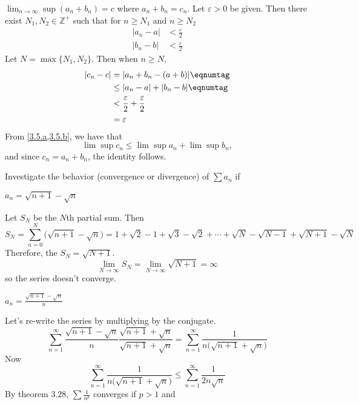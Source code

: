 \begin{exercise}
  \(\lim_{n\to\infty}\sup (a_n + b_n) = c\) where \(a_n + b_n = c_n\).
  Let \(\varepsilon > 0\) be given.
  Then there exist \(N_1,N_2\in\mathbb{Z}^+\) such that for \(n\geq N_1\) and
  \(n\geq N_2\)
  \begin{align*}
    \lvert a_n - a\rvert & < \frac{\varepsilon}{2}\\
    \lvert b_n - b\rvert & < \frac{\varepsilon}{2}
  \end{align*}
  Let \(N = \max\{N_1,N_2\}\).
  Then when \(n\geq N\),
  \begin{align*}
    \lvert c_n - c\rvert & = \lvert a_n + b_n - (a + b)\rvert
                           \eqnumtag\label{3.5.a}\\
                         & \leq \lvert a_n - a\rvert + \lvert b_n - b\rvert
                           \eqnumtag\label{3.5.b}\\
                         & < \frac{\varepsilon}{2} + \frac{\varepsilon}{2}\\
                         & = \varepsilon
  \end{align*}
  From \cref{3.5.a,3.5.b}, we have that
  \[
  \lim\sup c_n\leq\lim\sup a_n + \lim\sup b_n,
  \]
  and since \(c_n = a_n + b_n\), the identity follows.
\item
  Investigate the behavior (convergence or divergence) of \(\sum a_n\) if
  \begin{exercise}[label = (\alph*)]
  \item
    \(a_n = \sqrt{n + 1} - \sqrt{n}\)
    \par\smallskip
    Let \(S_N\) be the \(N\)th partial sum.
    Then
    \[
    S_N = \sum_{n = 0}^N\bigl(\sqrt{n + 1} - \sqrt{n}\bigr) =
    1 + \sqrt{2} - 1 + \sqrt{3} - \sqrt{2} + \cdots + \sqrt{N} - \sqrt{N - 1}
    + \sqrt{N + 1} - \sqrt{N}
    \]
    Therefore, the \(S_N = \sqrt{N + 1}\).
    \[
    \lim_{N\to\infty}S_N = \lim_{N\to\infty}\sqrt{N + 1} = \infty
    \]
    so the series doesn't converge.
  \item
    \(a_n = \frac{\sqrt{n + 1} - \sqrt{n}}{n}\)
    \par\smallskip
    Let's re-write the series by multiplying by the conjugate.
    \[
    \sum_{n = 1}^{\infty}\frac{\sqrt{n + 1} - \sqrt{n}}{n}
    \frac{\sqrt{n + 1} + \sqrt{n}}{\sqrt{n + 1} + \sqrt{n}} =
    \sum_{n = 1}^{\infty}\frac{1}{n\bigl(\sqrt{n + 1} + \sqrt{n}\bigr)}
    \]
    Now
    \[
    \sum_{n = 1}^{\infty}\frac{1}{n\bigl(\sqrt{n + 1} + \sqrt{n}\bigr)}\leq
    \sum_{n = 1}^{\infty}\frac{1}{2n\sqrt{n}}
    \]
    By theorem \(3.28\), \(\sum\frac{1}{n^p}\) converges if \(p > 1\) and

\end{exercise}
\end{exercise}
